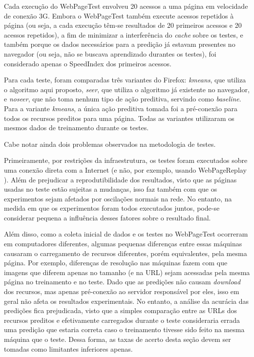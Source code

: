 \documentclass[10pt,twocolumn,letterpaper]{article}
\begin{document}
Cada execução do WebPageTest envolveu 20 acessos a uma página em velocidade de conexão 3G.  Embora o WebPageTest também execute acessos repetidos à página (ou seja, a cada execução têm-se resultados de 20 primeiros acessos e 20 acessos repetidos), a fim de minimizar a interferência do \emph{cache} sobre os testes, e também porque os dados necessários para a predição já estavam presentes no navegador (ou seja, não se buscava aprendizado durantes os testes), foi considerado apenas o SpeedIndex dos primeiros acessos.

Para cada teste, foram comparadas três variantes do Firefox: \emph{kmeans}, que utiliza o algoritmo aqui proposto, \emph{seer}, que utiliza o algoritmo já existente no navegador, e \emph{noseer}, que não toma nenhum tipo de ação preditiva, servindo como \emph{baseline}. Para a variante \emph{kmeans}, a única ação preditiva tomada foi a pré-conexão para todos os recursos preditos para uma página. Todas as variantes utilizaram os mesmos dados de treinamento durante os testes.

Cabe notar ainda dois problemas observados na metodologia de testes.

Primeiramente, por restrições da infraestrutura, os testes foram executados sobre uma conexão direta com a Internet (e não, por exemplo, usando WebPageReplay \cite{WebPageReplay:2013:Online}). Além de prejudicar a reprodutibilidade dos resultados, visto que as páginas usadas no teste estão sujeitas a mudanças, isso faz também com que os experimentos sejam afetados por oscilações normais na rede. No entanto, na medida em que os experimentos foram todos executados juntos, pode-se considerar pequena a influência desses fatores sobre o resultado final.

Além disso, como a coleta inicial de dados e os testes no WebPageTest ocorreram em computadores diferentes, algumas pequenas diferenças entre essas máquinas causaram o carregamento de recursos diferentes, porém equivalentes, pela mesma página. Por exemplo, diferenças de resolução nas máquinas fazem com que imagens que diferem apenas no tamanho (e na URL) sejam acessadas pela mesma página no treinamento e no teste. Dado que as predições não causam \emph{download} dos recursos, mas apenas pré-conexão ao servidor responsável por eles, isso em geral não afeta os resultados experimentais. No entanto, a análise da acurácia das predições fica prejudicada, visto que a simples comparação entre as URLs dos recursos preditos e efetivamente carregados durante o teste consideraria errada uma predição que estaria correta caso o treinamento tivesse sido feito na mesma máquina que o teste. Dessa forma, as taxas de acerto desta seção devem ser tomadas como limitantes inferiores apenas.
\end{document}
